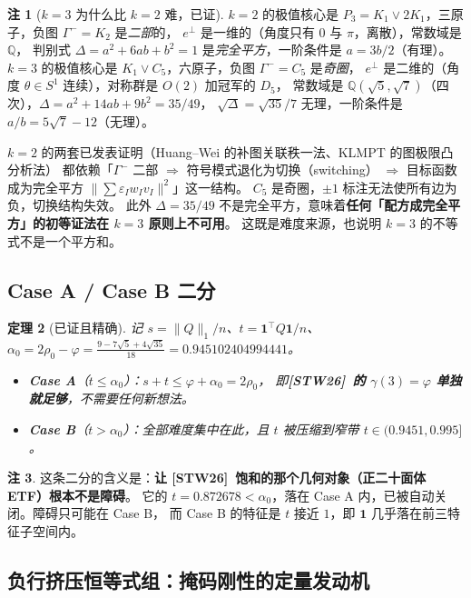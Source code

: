 \documentclass[UTF8,11pt]{ctexart}
\newtheorem{theorem}{定理}[section]
\theoremstyle{definition}
\newtheorem{remark}[theorem]{注}
\newcommand{\Q}{\mathbb{Q}}
\newcommand{\one}{\mathbf{1}}
\newcommand{\STW}{\textup{[STW26]}}
\begin{document}
\begin{remark}[$k=3$ 为什么比 $k=2$ 难，已证]
$k=2$ 的极值核心是 $P_3=K_1\vee2K_1$，三原子，负图 $\Gamma^-=K_2$ 是\emph{二部}的，
$e^\perp$ 是一维的（角度只有 $0$ 与 $\pi$，离散），常数域是 $\Q$，
判别式 $\Delta=a^2+6ab+b^2=1$ 是\emph{完全平方}，一阶条件是 $a=3b/2$（有理）。
$k=3$ 的极值核心是 $K_1\vee C_5$，六原子，负图 $\Gamma^-=C_5$ 是\emph{奇圈}，
$e^\perp$ 是二维的（角度 $\theta\in S^1$ 连续），对称群是 $O(2)$ 加冠军的 $D_5$，
常数域是 $\Q(\sqrt5,\sqrt7)$（四次），$\Delta=a^2+14ab+9b^2=35/49$，
$\sqrt\Delta=\sqrt{35}/7$ 无理，一阶条件是 $a/b=5\sqrt7-12$（无理）。

$k=2$ 的两套已发表证明（Huang--Wei 的补图关联秩一法、KLMPT 的图极限凸分析法）
都依赖「$\Gamma^-$ 二部 $\Rightarrow$ 符号模式退化为切换（switching）
$\Rightarrow$ 目标函数成为完全平方 $\|\sum\varepsilon_Iw_Iv_I\|^2$」这一结构。
$C_5$ 是奇圈，$\pm1$ 标注无法使所有边为负，切换结构失效。
此外 $\Delta=35/49$ 不是完全平方，意味着\textbf{任何「配方成完全平方」的初等证法在 $k=3$ 原则上不可用}。
这既是难度来源，也说明 $k=3$ 的不等式不是一个平方和。
\end{remark}

\subsection{Case A / Case B 二分}

\begin{theorem}[已证且精确]\label{thm:caseab}
记 $s=\|Q\|_1/n$、$t=\one^\top Q\one/n$、$\alpha_0=2\rho_0-\varphi=\frac{9-7\sqrt5+4\sqrt{35}}{18}=0.945102404994441$。
\begin{itemize}[leftmargin=1.2em,itemsep=1pt]
\item \textbf{Case A}（$t\le\alpha_0$）：$s+t\le\varphi+\alpha_0=2\rho_0$，
即\textbf{\STW\ 的 $\gamma(3)=\varphi$ 单独就足够}，不需要任何新想法。
\item \textbf{Case B}（$t>\alpha_0$）：全部难度集中在此，且 $t$ 被压缩到窄带 $t\in(0.9451,0.995]$。
\end{itemize}
\end{theorem}

\begin{remark}
这条二分的含义是：\textbf{让 \STW\ 饱和的那个几何对象（正二十面体 ETF）根本不是障碍}。
它的 $t=0.872678<\alpha_0$，落在 Case A 内，已被自动关闭。障碍只可能在 Case B，
而 Case B 的特征是 $t$ 接近 $1$，即 $\one$ 几乎落在前三特征子空间内。
\end{remark}

\subsection{负行挤压恒等式组：掩码刚性的定量发动机}\label{sec:squeeze}
\end{document}
